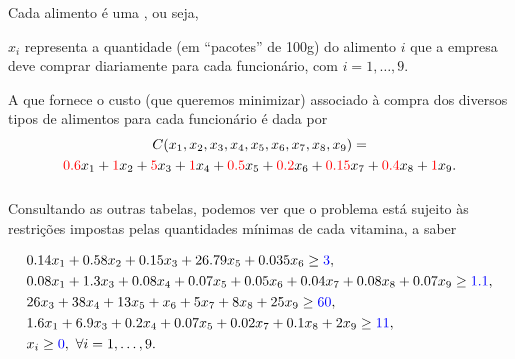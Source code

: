 \begin{frame}
 Cada alimento é uma , ou seja, 
 
 
 \begin{center}
 $x_i$ representa a quantidade (em ``pacotes'' de 100g) do alimento $i$ que a empresa deve comprar diariamente para cada funcionário, com $i=1,\ldots,9$. 
 \end{center}\bigskip

A  que fornece o custo (que queremos minimizar) associado à compra  dos diversos tipos de alimentos para cada funcionário é dada por 
\begin{multline*}
C(x_1,x_2,x_3,x_4,x_5,x_6,x_7,x_8,x_9)= \\ {\color{red}0.6}x_1 + {\color{red} 1}x_2 +{\color{red} 5}x_3+{\color{red} 1}x_4+{\color{red} 0.5}x_5+{\color{red} 0.2}   x_6+{\color{red} 0.15}x_7+{\color{red} 0.4}x_8+{\color{red} 1}x_9.
\end{multline*}


\end{frame}



\begin{frame}
\frametitle{ }

Consultando as outras tabelas, podemos ver que o problema está sujeito às restrições impostas pelas quantidades mínimas de cada vitamina, a saber

\begin{small}
\begin{align*}
&0.14x_1+0.58x_2+0.15x_3+26.79x_5+0.035x_6\geq {\color{blue} 3},\\
&0.08x_1+1.3x_3+0.08x_4+0.07x_5+0.05x_6+0.04x_7+0.08x_8+0.07x_9\geq {\color{blue} 1.1},\\
&26x_3+38x_4+13x_5+x_6+5x_7+8x_8+25x_9\geq {\color{blue} 60},\\
&1.6x_1+6.9x_3+0.2x_4+0.07x_5+0.02x_7+0.1x_8+2x_9\geq {\color{blue} 11},\\
&x_i\geq {\color{blue} 0}, \ \forall i=1,\ldots,9.
\end{align*} 
\end{small}


\end{frame}

